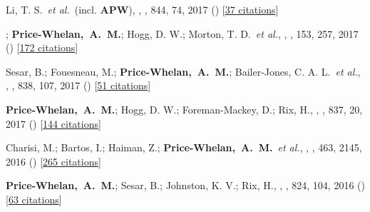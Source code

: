\item[{\color{deemph}\scriptsize27}]Li, T. S.~\textit{et al.}~(incl. \textbf{APW}), , \apj, 844, 74, 2017 () [\href{http://adsabs.harvard.edu/abs/2017ApJ...844...74L}{37 citations}]

\item[{\color{deemph}\scriptsize26}]; \textbf{Price-Whelan,~A.~M.}; Hogg, D. W.; Morton, T. D.~\textit{et al.}, , \aj, 153, 257, 2017 () [\href{http://adsabs.harvard.edu/abs/2017AJ....153..257O}{172 citations}]

\item[{\color{deemph}\scriptsize25}]Sesar, B.; Fouesneau, M.; \textbf{Price-Whelan,~A.~M.}; Bailer-Jones, C. A. L.~\textit{et al.}, , \apj, 838, 107, 2017 () [\href{http://adsabs.harvard.edu/abs/2017ApJ...838..107S}{51 citations}]

\item[{\color{deemph}\scriptsize24}]\textbf{Price-Whelan,~A.~M.}; Hogg, D. W.; Foreman-Mackey, D.; Rix, H., , \apj, 837, 20, 2017 () [\href{http://adsabs.harvard.edu/abs/2017ApJ...837...20P}{144 citations}]

\item[{\color{deemph}\scriptsize23}]Charisi, M.; Bartos, I.; Haiman, Z.; \textbf{Price-Whelan,~A.~M.}~\textit{et al.}, , \mnras, 463, 2145, 2016 () [\href{http://adsabs.harvard.edu/abs/2016MNRAS.463.2145C}{265 citations}]

\item[{\color{deemph}\scriptsize22}]\textbf{Price-Whelan,~A.~M.}; Sesar, B.; Johnston, K. V.; Rix, H., , \apj, 824, 104, 2016 () [\href{http://adsabs.harvard.edu/abs/2016ApJ...824..104P}{63 citations}]

